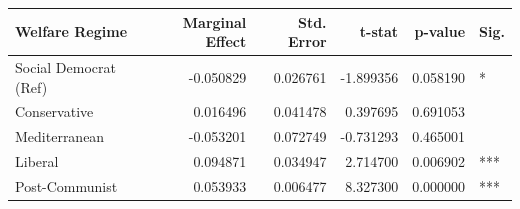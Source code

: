 \begin{tabular}{lrrrrl}
\toprule
Welfare Regime & Marginal Effect & Std. Error & t-stat & p-value & Sig. \\
\midrule
Social Democrat (Ref) & -0.050829 & 0.026761 & -1.899356 & 0.058190 & * \\
Conservative & 0.016496 & 0.041478 & 0.397695 & 0.691053 &  \\
Mediterranean & -0.053201 & 0.072749 & -0.731293 & 0.465001 &  \\
Liberal & 0.094871 & 0.034947 & 2.714700 & 0.006902 & *** \\
Post-Communist & 0.053933 & 0.006477 & 8.327300 & 0.000000 & *** \\
\bottomrule
\end{tabular}
